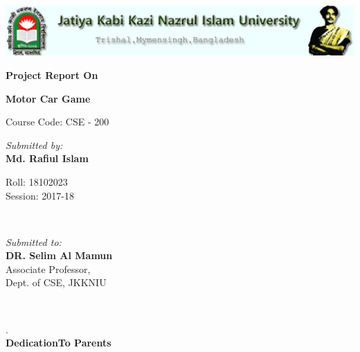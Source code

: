 \documentclass[12pt,a4paper]{report}
\begin{document}
	\begin{titlepage}
		
		\vspace{1cm}
		\includegraphics[width=.9\linewidth]{JKKNIU}\\
		\vspace{1cm}
		\begin{center}
			\huge\textbf{Project Report On}\par
			\vspace{.5cm}
			\LARGE\textbf{\color{blue}Motor Car Game}\par
			\vspace{1cm}
			\large Course Code: CSE - 200\par
			\vspace{5cm}
		\end{center}
		\begin{minipage}{0.4\textwidth}
			\begin{flushright}
				\huge \textit{Submitted by:}\\
				\large \textbf{Md. Rafiul Islam}\par
				Roll: 18102023\\
				Session: 2017-18\vspace{1cm}\\
			\end{flushright}
		\end{minipage}
		~
		\begin{minipage}{0.55\textwidth}
			\begin{flushright}
				\huge{\textit{Submitted to:}}\\
				\large\textbf{DR. Selim Al Mamun}\\
				Associate Professor,\\
				\normalsize Dept. of CSE, JKKNIU\\
			\end{flushright}
		\end{minipage}
		\vspace{4cm}\\
	\end{titlepage}
\begin{center}
	.\\
	\vspace{10cm}
	\LARGE{\textbf{\color{blue}DedicationTo Parents}}
\end{center}\newpage
\end{document}
